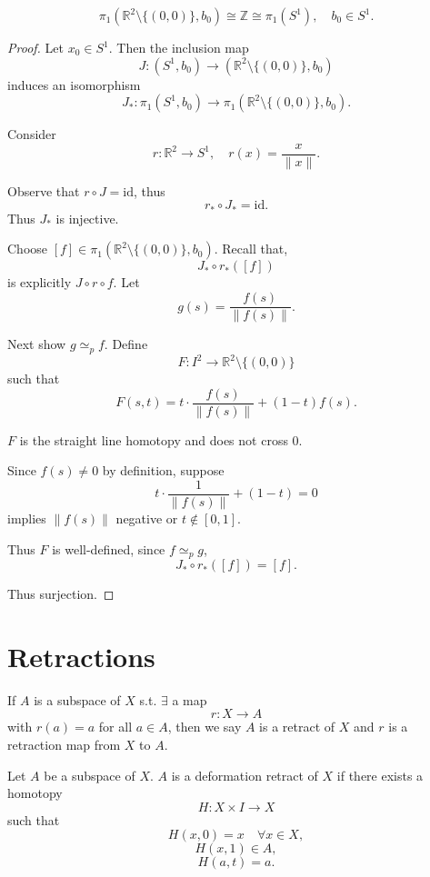 \documentclass[12pt]{amsart}
\begin{document}
\begin{theorem}
    \[\pi_1(\mathbb{R}^2 \setminus \{(0,0)\}, b_0) \cong \mathbb{Z} \cong \pi_1(S^1), \quad b_0 \in S^1.\]
\end{theorem}

\begin{proof}
    Let $x_0 \in S^1$. Then the inclusion map
    \[
    J : (S^1, b_0) \to (\mathbb{R}^2 \setminus \{(0,0)\}, b_0)
    \]
    induces an isomorphism
    \[
    J_* : \pi_1(S^1, b_0) \to \pi_1(\mathbb{R}^2 \setminus \{(0,0)\}, b_0).
    \]

    Consider
    \[
    r : \mathbb{R}^2 \to S^1, \quad r(x) = \frac{x}{\|x\|}.
    \]

    Observe that $r \circ J = \mathrm{id}$, thus
    \[
    r_* \circ J_* = \mathrm{id}.
    \]
    Thus $J_*$ is injective.

    Choose $[f] \in \pi_1(\mathbb{R}^2 \setminus \{(0,0)\}, b_0)$. Recall that,
    \[
    J_* \circ r_*([f])
    \]
    is explicitly $J \circ r \circ f$. Let
    \[
    g(s) = \frac{f(s)}{\|f(s)\|}.
    \]

    Next show $g \simeq_p f$. Define
    \[
    F : I^2 \to \mathbb{R}^2 \setminus \{(0,0)\}
    \]
    such that
    \[
    F(s,t) = t \cdot \frac{f(s)}{\|f(s)\|} + (1 - t) f(s).
    \]

    $F$ is the straight line homotopy and does not cross $0$.

    Since $f(s) \neq 0$ by definition, suppose
    \[
    t \cdot \frac{1}{\|f(s)\|} + (1 - t) = 0
    \]
    implies $\|f(s)\|$ negative or $t \notin [0,1]$.

    Thus $F$ is well-defined, since $f \simeq_p g$,
    \[
    J_* \circ r_*([f]) = [f].
    \]

    Thus surjection.
\end{proof}

\newpage 

\section{Retractions}

\begin{definition}
    If $A$ is a subspace of $X$ s.t. $\exists$ a map
    \[r : X \to A\]
    with $r(a) = a$ for all $a \in A$, then we say $A$ is a retract of $X$ and $r$ is a retraction map from $X$ to $A$.
\end{definition}

\begin{definition}
     Let $A$ be a subspace of $X$. $A$ is a deformation retract of $X$ if there exists a homotopy
    \[H : X \times I \to X\]
    such that
    \[H(x,0) = x \quad \forall x \in X,\]
    \[H(x,1) \in A,\]
    \[H(a,t) = a.\]
\end{definition}
\end{document}
